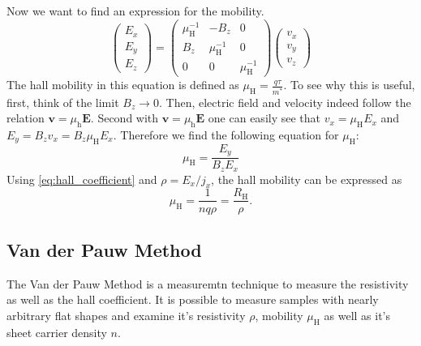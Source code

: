 Now we want to find an expression for the mobility.
\begin{equation}
	\begin{pmatrix}
		E_{x} \\
		E_{y} \\
		E_{z}
	\end{pmatrix}
	=\begin{pmatrix}
		\mu_\mathrm{H}^{-1} & -B_{z}              & 0                   \\
		B_{z}               & \mu_\mathrm{H}^{-1} & 0                   \\
		0                   & 0                   & \mu_\mathrm{H}^{-1}
	\end{pmatrix}
	\begin{pmatrix}
		v_{x} \\
		v_{y} \\
		v_{z}
	\end{pmatrix}
\end{equation}
The hall mobility in this equation is defined as $\mu_{\mathrm{H}}=\frac{q\tau}{m^{*}}$.
To see why this is useful, first, think of the limit $B_{z}\to 0$.
Then, electric field and velocity indeed follow the relation $\mathbf{v}=\mu_{\mathrm{h}}\mathbf{E}$.
Second with $\mathbf{v}=\mu_{\mathrm{h}}\mathbf{E}$ one can easily see that
$v_{x} = \mu_{\mathrm{H}}E_{x}$ and $E_{y}=B_{z}v_{x}=B_{z}\mu_{\mathrm{H}}E_{x}$.
Therefore we find the following equation for $\mu_\mathrm{H}$:
\begin{equation}
	\mu_{\mathrm{H}}=\frac{E_{y}}{B_{z}E_{x}} 
\end{equation}
Using \cref{eq:hall_coefficient} and $\rho=E_x / j_x$, the hall mobility can be expressed as
\begin{equation}
	\mu_{\mathrm{H}}=\frac{1}{nq\rho}=\frac{R_{\mathrm{H}}}{\rho}.
	\label{eq:hall_mobility}
\end{equation}

\subsection{Van der Pauw Method}
The Van der Pauw Method is a measuremtn technique to measure the resistivity as well as the hall coefficient.
It is possible to measure samples with nearly arbitrary flat shapes and examine it's resistivity $\rho$, 
mobility $\mu_\mathrm{H}$ as well as it's sheet carrier density $n$. 

